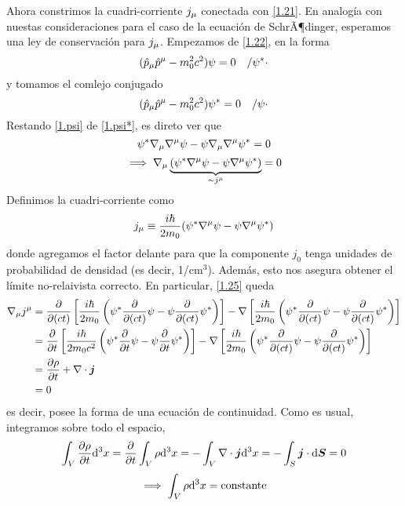 Ahora constrimos la cuadri-corriente $j_\mu $ conectada con \eqref{1.21}. En analogía con nuestas consideraciones para el caso de la ecuación de SchrÃ¶dinger, esperamos una ley de conservación para $j_\mu $. Empezamos de \eqref{1.22}, en la forma
\begin{equation}\label{1.psi*}
  (\hat{p}_\mu  \hat{p}^\mu -m_0^2c^2)\psi=0\quad /\psi^* \cdot
\end{equation}
y tomamos el comlejo conjugado
\begin{equation}\label{1.psi}
  (\hat{p}_\mu  \hat{p}^\mu -m_0^2c^2)\psi^*=0\quad /\psi\cdot
\end{equation}
Restando \eqref{1.psi} de \eqref{1.psi*}, es direto ver que
\begin{equation}
  \psi^*\nabla_\mu \nabla^\mu \psi-\psi\nabla_\mu \nabla^\mu \psi^*=0
\end{equation}\label{1.25}
\begin{equation}
  \implies \nabla_\mu \underbrace{(\psi^*\nabla^\mu \psi-\psi\nabla^\mu \psi^*)}_{\sim j^\mu }=0
\end{equation}
Definimos la cuadri-corriente como
\begin{equation}\label{1.26}
  j_\mu \equiv\frac{i\hbar}{2m_0}(\psi^*\nabla^\mu \psi-\psi\nabla^\mu \psi^*)
\end{equation}
donde agregamos el factor delante para que la componente $j_0$ tenga unidades de probabilidad de densidad (es decir, 1/cm$^3$). Además, esto nos asegura obtener el límite no-relaivista correcto. En particular, \eqref{1.25} queda
\begin{align*}
  \nabla_\mu j^\mu &=\pdv{(ct)}\left[\frac{i\hbar}{2m_0}\left(\psi^*\pdv{(ct)}\psi-\psi\pdv{(ct)}\psi^*\right)\right]-\nabla\left[\frac{i\hbar}{2m_0}\left(\psi^*\pdv{(ct)}\psi-\psi\pdv{(ct)}\psi^*\right)\right]\\
  &=\pdv{t}\left[\frac{i\hbar}{2m_0c^2}\left(\psi^*\pdv{t}\psi-\psi\pdv{t}\psi^*\right)\right]-\nabla\left[\frac{i\hbar}{2m_0}\left(\psi^*\pdv{(ct)}\psi-\psi\pdv{(ct)}\psi^*\right)\right]\\
  &=\pdv{\rho}{t}+\nabla\cdot\vb*{j}\\
  &=0
\end{align*}
es decir, posee la forma de una ecuación de continuidad. Como es usual, integramos sobre todo el espacio,
\begin{equation}
  \int_V\pdv{\rho}{t}\dd^3x=\pdv{t}\int_V\rho\dd^3x=-\int_V\nabla\cdot\vb*{j}\dd^3x=-\int_{S}\vb*{j}\cdot \dd \vb*{S}=0
\end{equation}
\begin{equation}
  \implies \int_V\rho\dd^3x=\rm constante
\end{equation}\label{1.29}
